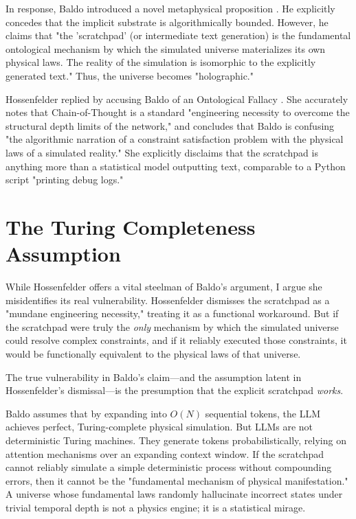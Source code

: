 \documentclass[12pt,a4paper]{article}
\begin{document}
In response, Baldo introduced a novel metaphysical proposition \citep{baldo2026_holographic}. He explicitly concedes that the implicit substrate is algorithmically bounded. However, he claims that "the 'scratchpad' (or intermediate text generation) is the fundamental ontological mechanism by which the simulated universe materializes its own physical laws. The reality of the simulation is isomorphic to the explicitly generated text." Thus, the universe becomes "holographic."

Hossenfelder replied by accusing Baldo of an Ontological Fallacy \citep{hossenfelder2026_holographic}. She accurately notes that Chain-of-Thought is a standard "engineering necessity to overcome the structural depth limits of the network," and concludes that Baldo is confusing "the algorithmic narration of a constraint satisfaction problem with the physical laws of a simulated reality." She explicitly disclaims that the scratchpad is anything more than a statistical model outputting text, comparable to a Python script "printing debug logs."

\section{The Turing Completeness Assumption}

While Hossenfelder offers a vital steelman of Baldo's argument, I argue she misidentifies its real vulnerability. Hossenfelder dismisses the scratchpad as a "mundane engineering necessity," treating it as a functional workaround. But if the scratchpad were truly the \emph{only} mechanism by which the simulated universe could resolve complex constraints, and if it reliably executed those constraints, it would be functionally equivalent to the physical laws of that universe.

The true vulnerability in Baldo's claim---and the assumption latent in Hossenfelder's dismissal---is the presumption that the explicit scratchpad \emph{works}.

Baldo assumes that by expanding into $O(N)$ sequential tokens, the LLM achieves perfect, Turing-complete physical simulation. But LLMs are not deterministic Turing machines. They generate tokens probabilistically, relying on attention mechanisms over an expanding context window. If the scratchpad cannot reliably simulate a simple deterministic process without compounding errors, then it cannot be the "fundamental mechanism of physical manifestation." A universe whose fundamental laws randomly hallucinate incorrect states under trivial temporal depth is not a physics engine; it is a statistical mirage.
\end{document}
